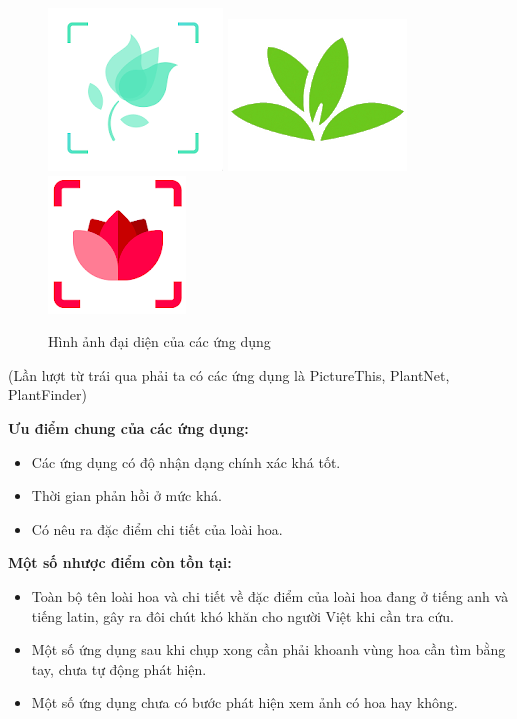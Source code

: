 \documentclass[12pt]{report}
\begin{document}
		\begin{figure}[h]
			\centering
			\includegraphics[scale=0.7]{picture_this_app}
			\includegraphics[scale=0.7]{plantnet_app}
			\includegraphics[scale=0.7]{plantfinder_app}
			\caption{Hình ảnh đại diện của các ứng dụng}
			\label{fig:app_logo_curent}
		\end{figure}
		(Lần lượt từ trái qua phải ta có các ứng dụng là PictureThis, PlantNet, PlantFinder)
		
		\textbf{Ưu điểm chung của các ứng dụng:}
		\begin{itemize}
			\item Các ứng dụng có độ nhận dạng chính xác khá tốt.
			\item Thời gian phản hồi ở mức khá.
			\item Có nêu ra đặc điểm chi tiết của loài hoa.
		\end{itemize}

		\textbf{Một số nhược điểm còn tồn tại:}
		\begin{itemize}
			\item Toàn bộ tên loài hoa và chi tiết về đặc điểm của loài hoa đang ở tiếng anh và tiếng latin, gây ra đôi chút khó khăn cho người Việt khi cần tra cứu.
			\item Một số ứng dụng sau khi chụp xong cần phải khoanh vùng hoa cần tìm bằng tay, chưa tự động phát hiện.
			\item Một số ứng dụng chưa có bước phát hiện xem ảnh có hoa hay không.
		\end{itemize}
																		
\end{document}
